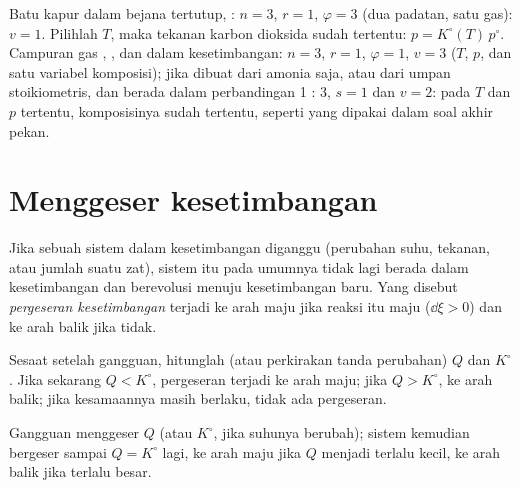 \begin{example}\label{ex:b2:equilibrium-shifts:variances}
Batu kapur dalam bejana tertutup, :
$n = 3$, $r =
1$, $\varphi = 3$ (dua padatan, satu gas): $v = 1$. Pilihlah
$T$, maka tekanan karbon dioksida sudah tertentu: $p = K^\circ(T)\,p^\circ$.
Campuran gas , , dan  dalam kesetimbangan: $n = 3$,
$r = 1$, $\varphi = 1$, $v
= 3$ ($T$, $p$, dan satu variabel komposisi);
jika dibuat dari amonia saja, atau dari umpan stoikiometris,  dan
 berada dalam perbandingan 1 : 3, $s = 1$ dan $v = 2$: pada $T$ dan
$p$ tertentu, komposisinya sudah tertentu, seperti yang dipakai dalam soal
akhir pekan.
\end{example}

\section{Menggeser kesetimbangan}

\begin{definition}\label{def:b2:equilibrium-shifts:shift}
Jika sebuah sistem dalam kesetimbangan diganggu (perubahan suhu, tekanan,
atau jumlah suatu zat), sistem itu pada umumnya tidak lagi berada dalam
kesetimbangan dan berevolusi menuju kesetimbangan baru. Yang disebut
\emph{pergeseran kesetimbangan} terjadi ke
arah maju jika reaksi itu maju ($\dd\xi > 0$) dan ke arah balik jika
tidak.
\end{definition}

\begin{method}\label{met:b2:equilibrium-shifts:predict-shift}
Sesaat setelah gangguan, hitunglah (atau perkirakan tanda perubahan) $Q$
dan $K^\circ$. Jika sekarang $Q < K^\circ$, pergeseran terjadi ke arah
maju; jika $Q > K^\circ$, ke arah balik; jika kesamaannya masih berlaku,
tidak ada pergeseran.
\end{method}

\begin{omfigure}

{\small Gangguan menggeser $Q$ (atau $K^\circ$, jika suhunya berubah);
sistem kemudian bergeser sampai $Q = K^\circ$ lagi, ke arah maju jika $Q$
menjadi terlalu kecil, ke arah balik jika terlalu besar.}
\end{omfigure}


